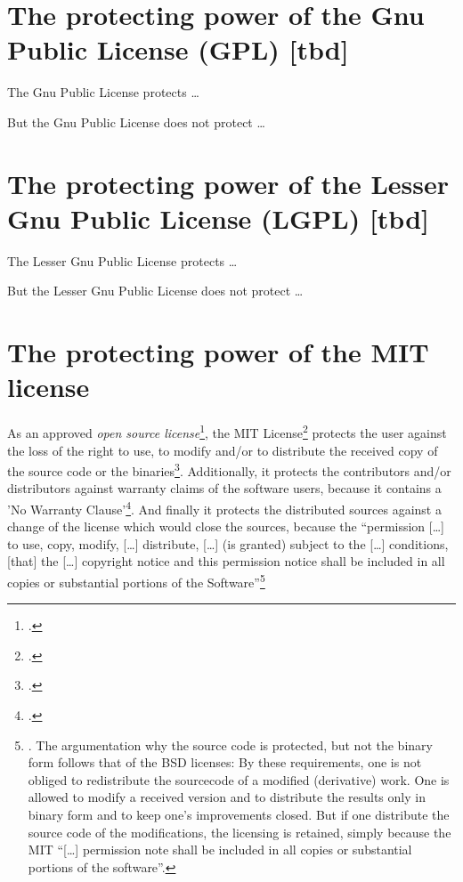 \section{The protecting power of the Gnu Public License (GPL) [tbd]}
\label{sec:ProtectingPowerOfGpl}

The Gnu Public License protects \ldots
 
But the Gnu Public License does not protect \ldots


\section{The protecting power of the Lesser Gnu Public License (LGPL) [tbd]}
\label{sec:ProtectingPowerOfLgpl}

The Lesser Gnu Public License  protects \ldots

But the Lesser Gnu Public License  does not protect \ldots


\section{The protecting power of the MIT license}
\label{sec:ProtectingPowerOfMit}

As an approved \emph{open source license}\footcite[cf.][\nopage wp]{OSI2012b},
the MIT License\footcite[MIT has to be resolved as \enquote{Massachusetts
Institute of Technology} (cf.][\nopage wp)]{wpMitLic2011a} protects the user
against the loss of the right to use, to modify and/or to distribute the
received copy of the source code or the binaries\footcite[cf.][\nopage wp
1ff]{OSI2012a}. Additionally, it protects the contributors and/or distributors
against warranty claims of the software users, because it contains a 'No
Warranty Clause'\footcite[cf.][\nopage wp]{MitLicense2012a}. And finally it
protects the distributed sources against a change of the license which would
close the sources, because the \enquote{permission [\ldots] to use, copy,
modify, [\ldots] distribute, [\ldots] (is granted) subject to the [\ldots]
conditions, [that] the [\ldots] copyright notice and this permission notice
shall be included in all copies or substantial portions of the
Software}\footnote{\cite[cf.][\nopage wp]{MitLicense2012a}. The argumentation
why the source code is protected, but not the binary form follows that of the
BSD licenses: By these requirements, one is not obliged to redistribute the
sourcecode of a modified (derivative) work. One is allowed to modify a received
version and to distribute the results only in binary form and to keep one's
improvements closed. But if one distribute the source code of the modifications,
the licensing is retained, simply because the MIT \enquote{[\ldots] permission
note shall be included in all copies or substantial portions of the software}.}

